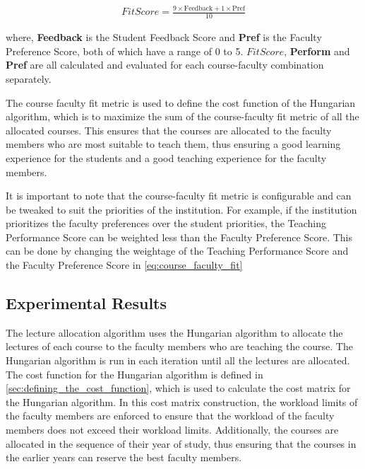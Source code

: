 \begin{equation}
  \label{eq:course_faculty_fit}
  \begin{aligned}
    FitScore = \frac{9 \times \text{Feedback} + 1 \times \text{Pref}}{10}
  \end{aligned}
\end{equation}

where, \textbf{Feedback} is the Student Feedback Score and \textbf{Pref} is the Faculty Preference Score, both of which have a range of 0 to 5. \(FitScore\), \textbf{Perform} and \textbf{Pref} are all calculated and evaluated for each course-faculty combination separately.

The course faculty fit metric is used to define the cost function of the Hungarian algorithm, which is to maximize the sum of the course-faculty fit metric of all the allocated courses. This ensures that the courses are allocated to the faculty members who are most suitable to teach them, thus ensuring a good learning experience for the students and a good teaching experience for the faculty members.

It is important to note that the course-faculty fit metric is configurable and can be tweaked to suit the priorities of the institution. For example, if the institution prioritizes the faculty preferences over the student priorities, the Teaching Performance Score can be weighted less than the Faculty Preference Score. This can be done by changing the weightage of the Teaching Performance Score and the Faculty Preference Score in \autoref{eq:course_faculty_fit}

\subsection{Experimental Results}

The lecture allocation algorithm uses the Hungarian algorithm to allocate the lectures of each course to the faculty members who are teaching the course. The Hungarian algorithm is run in each iteration until all the lectures are allocated. The cost function for the Hungarian algorithm is defined in \autoref{sec:defining_the_cost_function}, which is used to calculate the cost matrix for the Hungarian algorithm. In this cost matrix construction, the workload limits of the faculty members are enforced to ensure that the workload of the faculty members does not exceed their workload limits. Additionally, the courses are allocated in the sequence of their year of study, thus ensuring that the courses in the earlier years can reserve the best faculty members.

